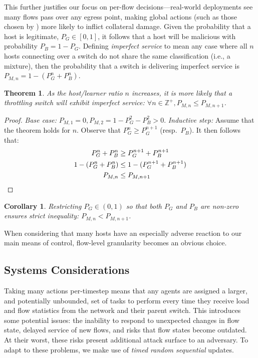 \documentclass[10pt, times, comsoc]{IEEEtran}
\newtheorem{thm}{Theorem}
\newtheorem{corr}{Corollary}[thm]
\begin{document}
This further justifies our focus on per-flow decisions---real-world deployments see many flows pass over any egress point, making global actions (such as those chosen by \textcite{DBLP:journals/eaai/MalialisK15}) more likely to inflict collateral damage.
Given the probability that a host is legitimate, $P_G \in [0,1]$, it follows that a host will be malicious with probability $P_B = 1 - P_G$.
Defining \emph{imperfect service} to mean any case where all $n$ hosts connecting over a switch do not share the same classification (i.e., a mixture), then the probability that a switch is delivering imperfect service is $P_{M,n} = 1 - (P_G^n + P_B^n)$.
\begin{thm}
	As the host/learner ratio $n$ increases, it is more likely that a throttling switch will exhibit imperfect service: $\forall n \in \mathbb{Z}^{+}, P_{M,n} \le P_{M,n+1}$.
\end{thm}
\begin{proof}
	\emph{Base case:} $P_{M,1}=0, P_{M,2} = 1 - P_G^2 - P_B^2 > 0$.
	\emph{Inductive step:} Assume that the theorem holds for $n$. Observe that $P_G^n \ge P_G^{n+1}$ (resp.\ $P_B$). It then follows that:
	\begin{align*}
	P_G^n + P_B^n &\ge P_G^{n+1} + P_B^{n+1}\\
	1 - (P_G^n + P_B^n) &\le 1 - (P_G^{n+1} + P_B^{n+1})\\
	P_{M,n} &\le P_{M,n+1} \qedhere
	\end{align*}
\end{proof}
\begin{corr}
	Restricting $P_G \in (0,1)$ so that both $P_G$ and $P_B$ are non-zero ensures strict inequality: $P_{M,n} < P_{M,n+1}$.
\end{corr}
When considering that many hosts have an especially adverse reaction to our main means of control, flow-level granularity becomes an obvious choice.

\subsection{Systems Considerations}
Taking many actions per-timestep means that any agents are assigned a larger, and potentially unbounded, set of tasks to perform every time they receive load and flow statistics from the network and their parent switch.
This introduces some potential issues: the inability to respond to unexpected changes in flow state, delayed service of new flows, and risks that flow states become outdated.
At their worst, these risks present additional attack surface to an adversary.
To adapt to these problems, we make use of \emph{timed random sequential} updates.
\end{document}
